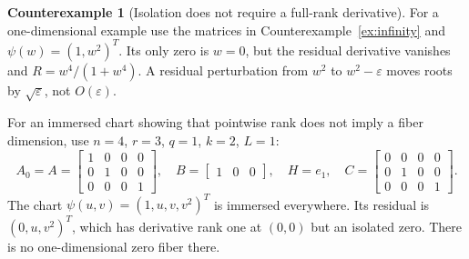 \documentclass[11pt,a4paper]{article}
\theoremstyle{definition}
\theoremstyle{definition}
\newtheorem{example}[theorem]{Counterexample}
\theoremstyle{remark}\newtheorem{remark}[theorem]{Remark}
\begin{document}
\begin{example}[Isolation does not require a full-rank derivative]\label{ex:singular}
For a one-dimensional example use the matrices in Counterexample~\ref{ex:infinity} and $\psi(w)=(1,w^2)^T$. Its only zero is $w=0$, but the residual derivative vanishes and $R=w^4/(1+w^4)$. A residual perturbation from $w^2$ to $w^2-\varepsilon$ moves roots by $\sqrt\varepsilon$, not $O(\varepsilon)$.

For an immersed chart showing that pointwise rank does not imply a fiber dimension, use $n=4$, $r=3$, $q=1$, $k=2$, $L=1$:
\[
A_0=A=\begin{bmatrix}1&0&0&0\\0&1&0&0\\0&0&0&1\end{bmatrix},\quad
B=\begin{bmatrix}1&0&0\end{bmatrix},\quad H=e_1,
\quad C=\begin{bmatrix}0&0&0&0\\0&1&0&0\\0&0&0&1\end{bmatrix}.
\]
The chart $\psi(u,v)=(1,u,v,v^2)^T$ is immersed everywhere. Its residual is $(0,u,v^2)^T$, which has derivative rank one at $(0,0)$ but an isolated zero. There is no one-dimensional zero fiber there.
\end{example}
\end{document}
